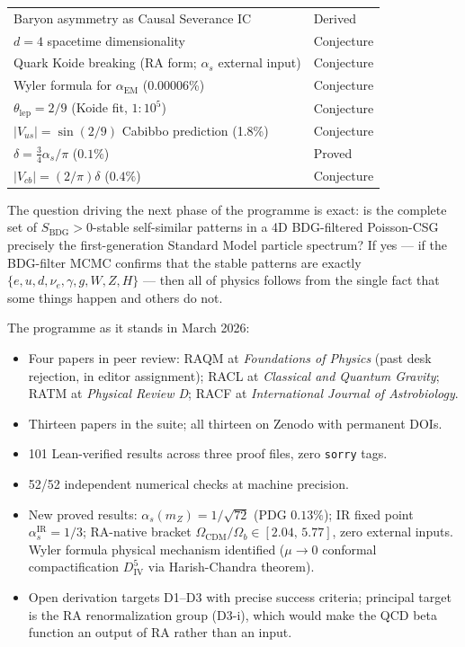\documentclass[11pt,a4paper]{article}
\newcommand{\SBDG}{S_{\mathrm{BDG}}}
\begin{document}
\begin{center}
\begin{tabular}{ll}
Baryon asymmetry as Causal Severance IC & Derived \\
$d = 4$ spacetime dimensionality & Conjecture \\
Quark Koide breaking (RA form; $\alpha_s$ external input) & Conjecture \\
Wyler formula for $\alpha_{\mathrm{EM}}$ (0.00006\%) & Conjecture \\
$\theta_{\mathrm{lep}} = 2/9$ (Koide fit, $1:10^5$) & Conjecture \\
$|V_{us}| = \sin(2/9)$ Cabibbo prediction (1.8\%) & Conjecture \\
$\delta = \tfrac{3}{4}\alpha_s/\pi$ ($0.1\%$) & Proved \\
$|V_{cb}| = (2/\pi)\delta$ ($0.4\%$) & Conjecture \\
\bottomrule
\end{tabular}
\end{center}

\medskip
The question driving the next phase of the programme is exact:
is the complete set of $\SBDG > 0$-stable self-similar patterns
in a 4D BDG-filtered Poisson-CSG precisely the first-generation
Standard Model particle spectrum? If yes --- if the BDG-filter MCMC
confirms that the stable patterns are exactly $\{e, u, d, \nu_e,
\gamma, g, W, Z, H\}$ --- then all of physics follows from the
single fact that some things happen and others do not.

\medskip
The programme as it stands in March 2026:
\begin{itemize}[noitemsep]
  \item Four papers in peer review: RAQM at \emph{Foundations of Physics}
  (past desk rejection, in editor assignment); RACL at
  \emph{Classical and Quantum Gravity}; RATM at \emph{Physical Review D};
  RACF at \emph{International Journal of Astrobiology}.
  \item Thirteen papers in the suite; all thirteen on Zenodo with permanent
  DOIs.
  \item 101 Lean-verified results across three proof files, zero
  \texttt{sorry} tags.
  \item 52/52 independent numerical checks at machine precision.
  \item New proved results: $\alpha_s(m_Z) = 1/\sqrt{72}$ (PDG $0.13\%$);
  IR fixed point $\alpha_s^{\mathrm{IR}} = 1/3$; RA-native bracket
  $\Omega_{\mathrm{CDM}}/\Omega_b \in [2.04,\,5.77]$, zero external inputs.
  Wyler formula physical mechanism identified ($\mu\to 0$ conformal
  compactification $D_{\mathrm{IV}}^5$ via Harish-Chandra theorem).
  \item Open derivation targets D1--D3 with precise success criteria;
  principal target is the RA renormalization group (D3-i), which would
  make the QCD beta function an output of RA rather than an input.
\end{itemize}
\end{document}
